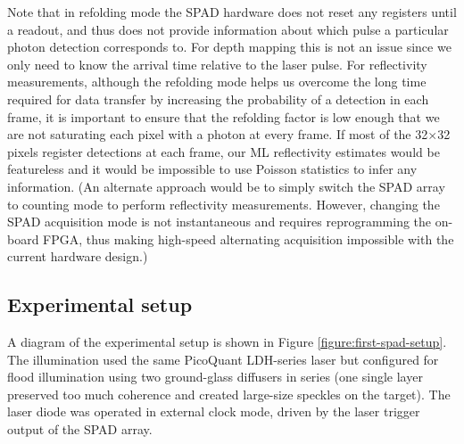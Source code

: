 Note that in refolding mode the SPAD hardware does not reset any registers until a readout, and thus does not provide information about which pulse a particular photon detection corresponds to. For depth mapping this is not an issue since we only need to know the arrival time relative to the laser pulse. For reflectivity measurements, although the refolding mode helps us overcome the long time required for data transfer by increasing the probability of a detection in each frame, it is important to ensure that the refolding factor is low enough that we are not saturating each pixel with a photon at every frame. If most of the 32$\times$32 pixels register detections at each frame, our ML reflectivity estimates would be featureless and it would be impossible to use Poisson statistics to infer any information. (An alternate approach would be to simply switch the SPAD array to counting mode to perform reflectivity measurements. However, changing the SPAD acquisition mode is not instantaneous and requires reprogramming the on-board FPGA, thus making high-speed alternating acquisition impossible with the current hardware design.)

\subsection{Experimental setup}
A diagram of the experimental setup is shown in Figure \ref{figure:first-spad-setup}. The illumination used the same PicoQuant LDH-series laser but configured for flood illumination using two ground-glass diffusers in series (one single layer preserved too much coherence and created large-size speckles on the target). The laser diode was operated in external clock mode, driven by the laser trigger output of the SPAD array.
 

